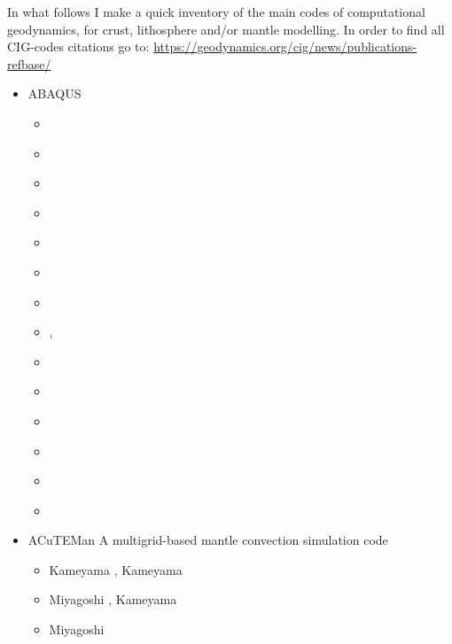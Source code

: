 
In what follows I make a quick inventory of the main codes of computational geodynamics, 
for crust, lithosphere and/or mantle modelling.
In order to find all CIG-codes citations go to: 
\url{https://geodynamics.org/cig/news/publications-refbase/}

\begin{itemize}

\item {\codefont ABAQUS} 

\begin{scriptsize}
\begin{itemize}
\item[\nineteeneightyeight]  \textcite{reyu98}
\item[\twothousand]          \textcite{reyu00}
\item[\twothousandone]       \textcite{brry01}
\item[\twothousandtwo]       \textcite{gedh02}
\item[\twothousandthree]     \textcite{fumr03}
\item[\twothousandsix]       \textcite{hapf06}
\item[\twothousandseven]     \textcite{camg07}
\item[\twothousandnine]      \textcite{kuhe09}, \textcite{makh09}
\item[\twothousandten]       \textcite{camg10}
\item[\twothousandtwelve]    \textcite{nalr12}
\item[\twothousandthirteen]  \textcite{soyl13}
\item[\twothousandfifteen]   \textcite{pevp15}
\item[\twothousandseventeen] \textcite{naam17}
\item[\twothousandeighteen]  \textcite{naam18}
\end{itemize}
\end{scriptsize}

\item {\codefont ACuTEMan} 
A multigrid-based mantle convection simulation code

\begin{scriptsize}
\begin{itemize}
\item[\twothousandfive] Kameyama \cite{kame05}, Kameyama \etal \cite{kaks05}
\item[\twothousandfifteen] Miyagoshi \etal \cite{miko15}, Kameyama \etal \cite{kamo15}
\item[\twothousandtwenty] Miyagoshi \etal \cite{miko20} 
\end{itemize}
\end{scriptsize}


\end{itemize}

